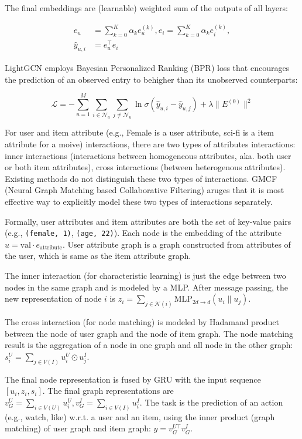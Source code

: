 The final embeddings are (learnable) weighted sum of the outputs of all layers:

\begin{align}
	e_u &= \sum_{k=0}^K \alpha_k e_u^{(k)}, e_i = \sum_{k=0}^K \alpha_k e_i^{(k)}, \\
	\hat{y}_{u,i} &= e_u^\top e_i
\end{align}

LightGCN employs Bayesian Personalized Ranking (BPR) loss that encourages the prediction of an observed entry to behigher than its unobserved counterparts:

\begin{equation}
	\mathcal{L} = - \sum_{u=1}^M \sum_{i \in \mathcal{N}_u} \sum_{j \ne \mathcal{N}_u} \ln \sigma (\hat{y}_{u,i} - \hat{y}_{u,j}) + \lambda \lVert E^{(0)} \rVert^2
\end{equation}

For user and item attribute (e.g., Female is a user attribute, sci-fi is a item attribute for a moive) interactions, there are two types of attributes interactions: inner interactions (interactions between homogeneous attributes, aka. both user or both item attributes), cross interactions (between heterogenous attributes).
Existing methods do not distinguish these two types of interactions.
GMCF~ (Neural Graph Matching based Collaborative Filtering) aruges that it is most effective way to explicitly model these two types of interactions separately.

Formally, user attributes and item attributes are both the set of key-value pairs (e.g., \texttt{(female, 1)}, \texttt{(age, 22)}).
Each node is the embedding of the attribute $u = \text{val} \cdot e_{\text{attribute}}$.
User attribute graph is a  graph constructed from attributes of the user, which is same as the item attribute graph.

The inner interaction (for characteristic learning) is just the edge between two nodes in the same graph and is modeled by a MLP.
After message passing, the new representation of node $i$ is $z_i = \sum_{j \in \mathcal{N}(i)} \text{MLP}_{2d \rightarrow d} (u_i \parallel u_j)$.

The cross interaction (for node matching) is modeled by Hadamand product between the node of user graph and the node of item graph.
The node matching result is the aggregation of a node in one graph and all node in the other graph: $s_i^U = \sum_{j \in V(I)} u_i^U \odot u_j^I$.

The final node representation is fused by GRU with the input sequence $[u_i, z_i, s_i]$.
The final graph representations are $v_G^U = \sum_{i \in V(U)} u_i^U, v_G^I = \sum_{i \in V(I)} u_i^I$.
The task is the prediction of an action (e.g., watch, like) w.r.t. a user and an item, using the inner product (graph matching) of user graph and item graph: $\hat{y} = v_G^{U \top} v_G^I$.

